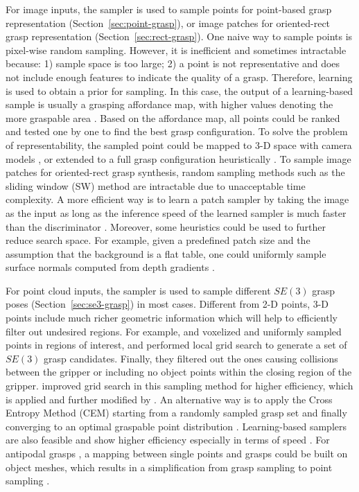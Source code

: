 \documentclass[letterpaper,10pt]{article}
\newcommand{\secref}[1]{Section~\ref{#1}}
\newcommand{\sethree}{SE(3)}
\begin{document}
For image inputs, the sampler is used to sample points for point-based grasp representation (\secref{sec:point-grasp}), or image patches for oriented-rect grasp representation (\secref{sec:rect-grasp}). 
One naive way to sample points is pixel-wise random sampling.
However, it is inefficient and sometimes intractable because: 1) sample space is too large; 2) a point is not representative and does not include enough features to indicate the quality of a grasp.
Therefore, learning is used to obtain a prior for sampling.
In this case, the output of a learning-based sample is usually a grasping affordance map, with higher values denoting the more graspable area \cite{saxena2006robotic, saxena2008robotic, bohg2009grasping, rao2010grasping, bohg2010learning, li2020learning, gou2021rgb}.
Based on the affordance map, all points could be ranked and tested one by one to find the best grasp configuration.
To solve the problem of representability, the sampled point could be mapped to 3-D space with camera models \cite{saxena2006robotic, saxena2008robotic, bohg2009grasping, bohg2010learning, gou2021rgb}, or extended to a full grasp configuration heuristically \cite{rao2010grasping}.
To sample image patches for oriented-rect grasp synthesis, random sampling methods such as the sliding window (SW) method are intractable due to unacceptable time complexity.
A more efficient way is to learn a patch sampler by taking the image as the input as long as the inference speed of the learned sampler is much faster than the discriminator \cite{jiang2011efficient, lenz2015deep, wang2016robot}.
Moreover, some heuristics could be used to further reduce search space.
For example, given a predefined patch size and the assumption that the background is a flat table, one could uniformly sample surface normals computed from depth gradients \cite{mahler2017dex, mahler2018dex}.


For point cloud inputs, the sampler is used to sample different $\sethree$ grasp poses (\secref{sec:se3-grasp}) in most cases.
Different from 2-D points, 3-D points include much richer geometric information which will help to efficiently filter out undesired regions.
For example, \cite{gualtieri2016high} and \cite{ten2017grasp} voxelized and uniformly sampled points in regions of interest, and performed local grid search to generate a set of $\sethree$ grasp candidates.
Finally, they filtered out the ones causing collisions between the gripper or including no object points within the closing region of the gripper.
\cite{ten2018using} improved grid search in this sampling method for higher efficiency, which is applied and further modified by \cite{liang2019pointnetgpd}.
An alternative way is to apply the Cross Entropy Method (CEM) \cite{rubinstein2004cross} starting from a randomly sampled grasp set and finally converging to an optimal graspable point distribution \cite{mahler2017dex, mahler2018dex, yan2019data}.
Learning-based samplers are also feasible and show higher efficiency especially in terms of speed \cite{mousavian20196, yang2021robotic}.
For antipodal grasps \cite{chen1993finding}, a mapping between single points and grasps could be built on object meshes, which results in a simplification from grasp sampling to point sampling \cite{rao2010grasping, mahler2017dex}.
\end{document}
